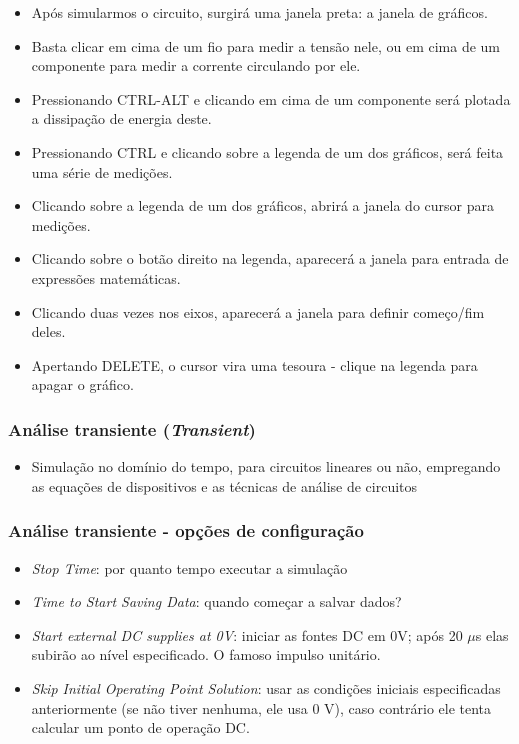 \documentclass{beamer}
\begin{document}
\begin{frame}
\begin{itemize}
\item{Após simularmos o circuito, surgirá uma janela preta: a janela de gráficos.}
\item{Basta clicar em cima de um fio para medir a tensão nele, ou em cima de um componente para medir a corrente circulando por ele.}
\item{Pressionando CTRL-ALT e clicando em cima de um componente será plotada a dissipação de energia deste.}
\item{Pressionando CTRL e clicando sobre a legenda de um dos gráficos, será feita uma série de medições.}
\pause
\item{Clicando sobre a legenda de um dos gráficos, abrirá a janela do cursor para medições.}
\item{Clicando sobre o botão direito na legenda, aparecerá a janela para entrada de expressões matemáticas.}
\item{Clicando duas vezes nos eixos, aparecerá a janela para definir começo/fim deles.}
\pause
\item{Apertando DELETE, o cursor vira uma tesoura - clique na legenda para apagar o gráfico.}
\end{itemize}
\end{frame}



\begin{frame}
\frametitle{Análise transiente (\textit{Transient})}
\begin{itemize}
\item{Simulação no domínio do tempo, para circuitos lineares ou não, empregando as equações de dispositivos e as técnicas de análise de circuitos}
\end{itemize}
\end{frame}

\begin{frame}
\frametitle{Análise transiente - opções de configuração}
\begin{itemize} 
\item \textit{Stop Time}: por quanto tempo executar a simulação
\item \textit{Time to Start Saving Data}: quando começar a salvar dados?
\item \textit{Start external DC supplies at 0V}: iniciar as fontes DC em 0V; após 20 $\mu$s elas subirão ao nível especificado. O famoso impulso unitário.
\item \textit{Skip Initial Operating Point Solution}: usar as condições iniciais especificadas anteriormente (se não tiver nenhuma, ele usa 0 V), caso contrário ele tenta calcular um ponto de operação DC.
\end{itemize}
\end{frame}
\end{document}

